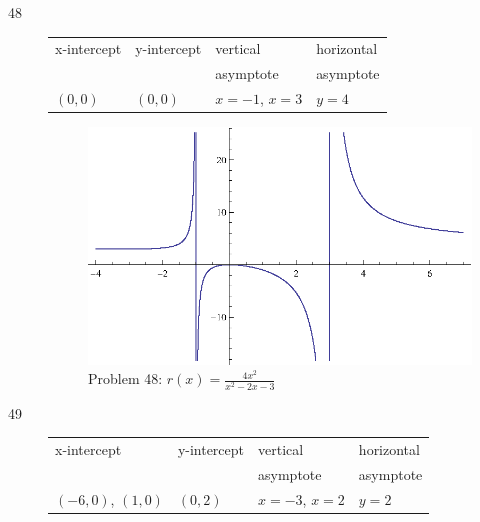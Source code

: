 \documentclass{exam}
\begin{document}
\begin{description}
    \item[48]
      \begin{tabular}{llll}
        \toprule
        x-intercept & y-intercept & vertical          & horizontal \\
                    &             & asymptote         & asymptote \\
        \midrule
        $(0, 0)$    & $(0, 0)$    & $x = -1$, $x = 3$ & $y = 4$ \\
        \bottomrule
      \end{tabular}

      \begin{figure}[H]
        \centering
        \includegraphics[scale = 0.8]{problem48.eps}
        \caption*{ Problem 48: $r(x) = \frac{4x^2}{x^2 - 2x - 3}$ }
      \end{figure}

    \item[49]
      \begin{tabular}{llll}
        \toprule
        x-intercept         & y-intercept & vertical          & horizontal \\
                            &             & asymptote         & asymptote \\
        \midrule
        $(-6, 0)$, $(1, 0)$ & $(0, 2)$    & $x = -3$, $x = 2$ & $y = 2$ \\
        \bottomrule
      \end{tabular}


\end{description}
\end{document}

